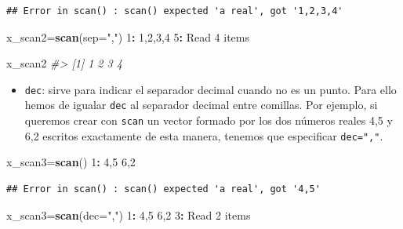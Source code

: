 \documentclass[
]{book}
\newenvironment{Shaded}{\begin{snugshade}}{\end{snugshade}}
\newcommand{\CommentTok}[1]{\textcolor[rgb]{0.56,0.35,0.01}{\textit{#1}}}
\newcommand{\DataTypeTok}[1]{\textcolor[rgb]{0.13,0.29,0.53}{#1}}
\newcommand{\DecValTok}[1]{\textcolor[rgb]{0.00,0.00,0.81}{#1}}
\newcommand{\KeywordTok}[1]{\textcolor[rgb]{0.13,0.29,0.53}{\textbf{#1}}}
\newcommand{\NormalTok}[1]{#1}
\newcommand{\OperatorTok}[1]{\textcolor[rgb]{0.81,0.36,0.00}{\textbf{#1}}}
\newcommand{\StringTok}[1]{\textcolor[rgb]{0.31,0.60,0.02}{#1}}
\providecommand{\tightlist}{%
  \setlength{\itemsep}{0pt}\setlength{\parskip}{0pt}}
\theoremstyle{definition}
\theoremstyle{definition}
\theoremstyle{definition}
\theoremstyle{remark}
\begin{document}
\begin{verbatim}
## Error in scan() : scan() expected 'a real', got '1,2,3,4'
\end{verbatim}

\begin{Shaded}
\begin{Highlighting}[]
\NormalTok{x\_scan2=}\KeywordTok{scan}\NormalTok{(}\DataTypeTok{sep=}\StringTok{","}\NormalTok{)}
\DecValTok{1}\OperatorTok{:}\StringTok{ }\DecValTok{1}\NormalTok{,}\DecValTok{2}\NormalTok{,}\DecValTok{3}\NormalTok{,}\DecValTok{4}
\DecValTok{5}\OperatorTok{:}\StringTok{ }
\NormalTok{Read }\DecValTok{4}\NormalTok{ items}
\end{Highlighting}
\end{Shaded}

\begin{Shaded}
\begin{Highlighting}[]
\NormalTok{x\_scan2}
\CommentTok{\#\textgreater{} [1] 1 2 3 4}
\end{Highlighting}
\end{Shaded}

\begin{itemize}
\tightlist
\item
  \texttt{dec}: sirve para indicar el separador decimal cuando no es un punto.
  Para ello hemos de igualar \texttt{dec} al separador decimal entre comillas.
  Por ejemplo, si queremos crear con \texttt{scan} un vector formado por los dos números reales 4,5 y 6,2 escritos exactamente de esta manera, tenemos que especificar \texttt{dec=","}.
\end{itemize}

\begin{Shaded}
\begin{Highlighting}[]
\NormalTok{x\_scan3=}\KeywordTok{scan}\NormalTok{()}
\DecValTok{1}\OperatorTok{:}\StringTok{ }\DecValTok{4}\NormalTok{,}\DecValTok{5} \DecValTok{6}\NormalTok{,}\DecValTok{2}
\end{Highlighting}
\end{Shaded}

\begin{verbatim}
## Error in scan() : scan() expected 'a real', got '4,5'
\end{verbatim}

\begin{Shaded}
\begin{Highlighting}[]
\NormalTok{x\_scan3=}\KeywordTok{scan}\NormalTok{(}\DataTypeTok{dec=}\StringTok{","}\NormalTok{)}
\DecValTok{1}\OperatorTok{:}\StringTok{ }\DecValTok{4}\NormalTok{,}\DecValTok{5} \DecValTok{6}\NormalTok{,}\DecValTok{2}
\DecValTok{3}\OperatorTok{:}\StringTok{ }
\NormalTok{Read }\DecValTok{2}\NormalTok{ items}
\end{Highlighting}
\end{Shaded}
\end{document}
